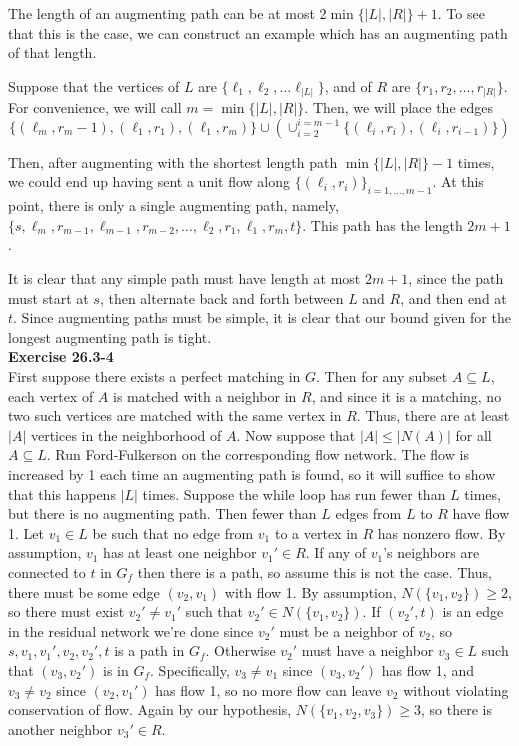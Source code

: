 \documentclass{article}
\begin{document}
The length of an augmenting path can be at most $2\min\{|L|,|R|\}+1$. To see that this is the case, we can construct an example which has an augmenting path of that length.

Suppose that the vertices of $L$ are $\{\ell_1, \ell_2, \ldots \ell_{|L|}\}$, and of $R$ are $\{r_1,r_2, \ldots, r_{|R|}\}$. For convenience, we will call $m = \min\{|L|,|R|\}$. Then, we will place the edges 
\[
\{(\ell_{m} , r_{m}-1),(\ell_1,r_1), (\ell_1, r_m)\} \cup \left(\cup_{i=2}^{i=m-1} \{(\ell_i,r_i),(\ell_i,r_{i-1})\}\right)
\]

Then, after augmenting with the shortest length path $\min\{|L|,|R|\}-1$ times, we could end up having sent a unit flow along $\{(\ell_i,r_i)\}_{i =1,\ldots,m-1}$. At this point, there is only a single augmenting path, namely, $\{s,\ell_m,r_{m-1},\ell_{m-1}, r_{m-2}, \ldots, \ell_2, r_1,\ell_1, r_m,  t\}$. This path has the length $2 m+1$.

It is clear that any simple path must have length at most $2m +1$, since the path must start at $s$, then alternate back and forth between $L$ and $R$, and then end at $t$. Since augmenting paths must be simple, it is clear that our bound given for the longest augmenting path is tight.\\

\noindent\textbf{Exercise 26.3-4}\\

First suppose there exists a perfect matching in $G$.  Then for any subset $A \subseteq L$, each vertex of $A$ is matched with a neighbor in $R$, and since it is a matching, no two such vertices are matched with the same vertex in $R$.  Thus, there are at least $|A|$ vertices in the neighborhood of $A$.  Now suppose that $|A| \leq |N(A)|$ for all $A \subseteq L$.  Run Ford-Fulkerson on the corresponding flow network. The flow is increased by 1 each time an augmenting path is found, so it will suffice to show that this happens $|L|$ times. Suppose the while loop has run fewer than $L$ times, but there is no augmenting path.  Then fewer than $L$ edges from $L$ to $R$ have flow 1.  Let $v_1 \in L$ be such that no edge from $v_1$ to a vertex in $R$ has nonzero flow.  By assumption, $v_1$ has at least one neighbor $v_1' \in R$.  If any of $v_1$'s neighbors are connected to $t$ in $G_f$ then there is a path, so assume this is not the case. Thus, there must be some edge $(v_2, v_1)$ with flow 1.  By assumption, $N(\{v_1, v_2\}) \geq 2$, so there must exist $v_2' \neq v_1'$ such that $v_2' \in N(\{v_1, v_2\})$.  If $(v_2',t)$ is an edge in the residual network we're done since $v_2'$ must be a neighbor of $v_2$, so $s, v_1, v_1', v_2, v_2', t$ is a path in $G_f$.  Otherwise $v_2'$ must have a neighbor $v_3 \in L$ such that $(v_3, v_2')$ is in $G_f$.  Specifically, $v_3 \neq v_1$ since $(v_3, v_2')$ has flow 1, and $v_3 \neq v_2$ since $(v_2, v_1')$ has flow 1, so no more flow can leave $v_2$ without violating conservation of flow.  Again by our hypothesis, $N(\{v_1, v_2, v_3\}) \geq 3$, so there is another neighbor $v_3' \in R$.  
\end{document}
